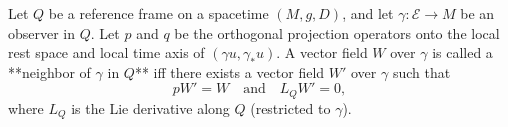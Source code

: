 Let $Q$ be a reference frame on a spacetime $(M, g, D)$, and let $\gamma: \mathcal{E} \to M$ be an observer in $Q$. Let $p$ and $q$ be the orthogonal projection operators onto the local rest space and local time axis of $(\gamma u, \gamma_* u)$. A vector field $W$ over $\gamma$ is called a **neighbor of $\gamma$ in $Q$** iff there exists a vector field $W'$ over $\gamma$ such that
$$pW' = W \quad\text{and}\quad L_Q W' = 0,$$
where $L_Q$ is the Lie derivative along $Q$ (restricted to $\gamma$).
